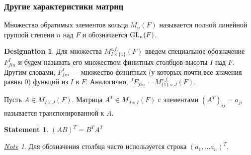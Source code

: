 \documentclass[11pt]{book}
\newcommand{\GL}{{\mathop{\text{\rm GL}}}}
\theoremstyle{definition}
\theoremstyle{plain}
\theoremstyle{plain}
\newtheorem{st}{Statement}
\theoremstyle{definition}
\newtheorem*{name}{Designation}
\theoremstyle{remark}
\newtheorem*{note}{\underline{Note}}
\begin{document}
\subsubsection{Другие характеристики матриц}
\begin{defn}
    Множество обратимых элементов кольца $ M_n(F)$ называется  {\sf полной линейной группой} степени  $ n$ над  $ F$ и обозначается  $ \GL_{n}(F)$.
\end{defn}
\begin{name}
    Для множества $ M_{I \times \{1\}}^{c.f.}(F)$ введем специальное обозначение $ F^{I}_{fin}$ и будем называть его {\sf множеством финитных столбцов} высоты $ I$ над  $ F$. Другим словами, $ F_{fin}^{I}$ --- множество финитных (у которых почти все значения равны 0) функций из $ I$ в  $ F$.
    Аналогично, $ ^J\!F_{fin}= M_{\{1\}\times J}^{r.f.}(F)$.
\end{name}
\begin{defn}
    Пусть $ A \in M_{I \times J}(F)$. Матрица $ A^{T} \in M_{J \times I}(F)$ с элементами $ (A^{T})_{ij} = a_{ji}$ называется {\sf транспонированной} к $ A$.
\end{defn}
\begin{st}
    $ (AB)^{T} = B^{T}A^{T}$
\end{st}
\begin{note}
    Для обозначения столбца часто используется строка $ (a_1, \ldots a_n)^{T}$.
\end{note}
\end{document}
